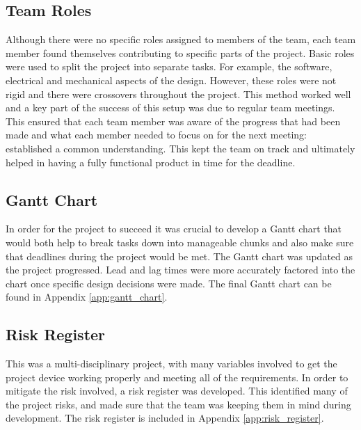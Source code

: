 \documentclass[a4paper,12pt]{article}
\begin{document}
\subsection{Team Roles}
\label{sec:team_roles}

Although there were no specific roles assigned to members of the team, each team member found themselves contributing to specific parts of the project. Basic roles were used to split the project into separate tasks. For example, the software, electrical and mechanical aspects of the design. However, these roles were not rigid and there were crossovers throughout the project. This method worked well and a key part of the success of this setup was due to regular team meetings. This ensured that each team member was aware of the progress that had been made and what each member needed to focus on for the next meeting: established a common understanding. This kept the team on track and ultimately helped in having a fully functional product in time for the deadline.

\subsection{Gantt Chart}
\label{sec:gantt_chart}

In order for the project to succeed it was crucial to develop a Gantt chart that would both help to break tasks down into manageable chunks and also make sure that deadlines during the project would be met. The Gantt chart was updated as the project progressed. Lead and lag times were more accurately factored into the chart once specific design decisions were made. The final Gantt chart can be found in Appendix \ref{app:gantt_chart}.

\subsection{Risk Register}
\label{sec:risk_register}

This was a multi-disciplinary project, with many variables involved to get the project device working properly and meeting all of the requirements. In order to mitigate the risk involved, a risk register was developed. This identified many of the project risks, and made sure that the team was keeping them in mind during development. The risk register is included in Appendix \ref{app:risk_register}.

\end{document}
